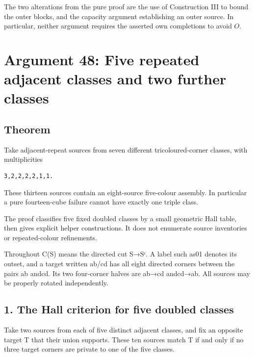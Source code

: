\documentclass[
  10pt,
]{article}
\begin{document}
The two alterations from the pure proof are the use of Construction III
to bound the outer blocks, and the capacity argument establishing an
outer source. In particular, neither argument requires the asserted own
completions to avoid \(O\).

\hypertarget{arg-48}{%
\section{Argument 48: Five repeated adjacent classes and two further
classes}\label{arg-48}}

\hypertarget{theorem}{%
\subsection*{Theorem}\label{theorem}}

Take adjacent-repeat sources from seven different tricoloured-corner
classes, with multiplicities

\begin{verbatim}
3,2,2,2,2,1,1.
\end{verbatim}

These thirteen sources contain an eight-source five-colour assembly. In
particular a pure fourteen-cube failure cannot have exactly one triple
class.

The proof classifies five fixed doubled classes by a small geometric
Hall table, then gives explicit helper constructions. It does not
enumerate source inventories or repeated-colour refinements.

Throughout C(S) means the directed cut S→Sᶜ. A label such as01 denotes
its outset, and a target written ab/cd has all eight directed corners
between the pairs ab andcd. Its two four-corner halves are ab→cd
andcd→ab. All sources may be properly rotated independently.

\hypertarget{the-hall-criterion-for-five-doubled-classes}{%
\subsection*{1. The Hall criterion for five doubled
classes}\label{the-hall-criterion-for-five-doubled-classes}}

Take two sources from each of five distinct adjacent classes, and fix an
opposite target T that their union supports. These ten sources match T
if and only if no three target corners are private to one of the five
classes.
\end{document}
